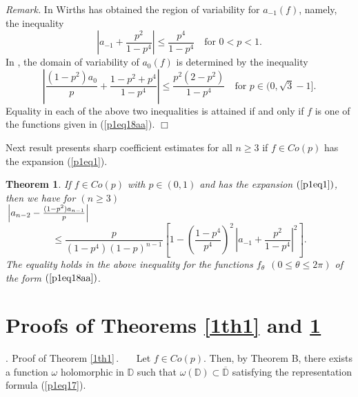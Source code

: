 \documentclass[leqno,
12pt]{amsart}
\newtheorem{thm}{Theorem}[section]
\theoremstyle{definition}
\newenvironment{rem}{\bigskip
\noindent \textsl{{\sl Remark. }}}{\bigskip}
\newcounter {own}
\newenvironment{nonsec}{\bf
\setcounter{own}{\value{equation}}\addtocounter{equation}{1}
\refstepcounter{own}
\bigskip

\indent {\thesection       .\arabic{own}}.$\ \,$}{$\,$.\ \ \ }
\begin{document}
\begin{rem}
In \cite{Wirths-pre} Wirths  has obtained the region of variability
for $a_{-1}(f)$, namely, the inequality
$$
\left |a_{-1}+ \frac{p^2}{1-p^4}\right |\leq \frac{p^4}{1-p^4}
\quad \mbox{for $0<p<1$}.
$$
In \cite{BPW1}, the domain of variability of $a_0(f)$
is determined by the inequality
$$\left|\frac{(1-p^2)a_0}{p}+\frac{1-p^2+p^4}{1-p^4}\right|
\leq \frac{p^2(2-p^2)}{1-p^4} \quad \mbox{for $p\in (0,\sqrt{3}-1]$}.
$$
Equality in each of the above two inequalities is attained if and only if
$f$ is one of the functions given in (\ref{p1eq18aa}).
\hfill $\Box$\end{rem}

Next result presents sharp coefficient estimates for all $n\geq 3$
if $f\in Co(p)$ has the expansion (\ref{p1eq1}).

\begin{thm}\label{1th2}
If $f\in Co(p)$ with $p\in (0,1)$ and has the expansion $(\ref{p1eq1})$, then we have for $(n\geq 3)$\\

${\displaystyle} \left|a_{n-2}-\frac{(1-p^2)a_{n-1}}{p}\right|$
\begin{equation}\label{p1eq18}
\leq
\frac{p}{(1-p^4)(1-p)^{n-1}}
\left[1-\left (\frac{1-p^4}{p^4}\right )^2\,
\left|a_{-1}+\frac{p^2}{1-p^4}\right|^2\right].
\end{equation}
The equality holds in the above inequality for the functions $f_\theta
~~(0\leq\theta\leq 2\pi)$ of the form $(\ref{p1eq18aa})$.
\end{thm}

\section{Proofs of Theorems \ref{1th1} and \ref{1th2}}\label{1proofs}
\begin{nonsec}Proof of Theorem \ref{1th1}\end{nonsec}
Let $f\in Co(p)$. Then, by Theorem B,
there exists a function $\omega$ holomorphic in ${{\mathbb D}}$ such that
$\omega({{\mathbb D}})\subset \overline{{\mathbb D}}$ satisfying
the representation formula (\ref{p1eq17}).
\end{document}

